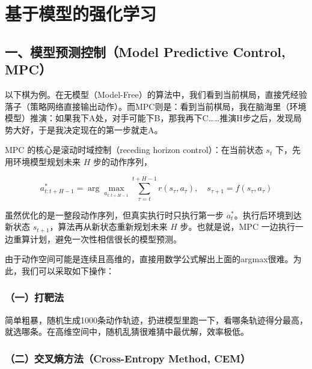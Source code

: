 \clearpage

\hypertarget{ux57faux4e8eux6a21ux578bux7684ux5f3aux5316ux5b66ux4e60}{%
\section{基于模型的强化学习}\label{ux57faux4e8eux6a21ux578bux7684ux5f3aux5316ux5b66ux4e60}}

\hypertarget{ux4e00ux6a21ux578bux9884ux6d4bux63a7ux5236model-predictive-control-mpc}{%
\subsection{一、模型预测控制（Model Predictive Control, MPC）}\label{ux4e00ux6a21ux578bux9884ux6d4bux63a7ux5236model-predictive-control-mpc}}

以下棋为例。在无模型（Model-Free）的算法中，我们看到当前棋局，直接凭经验落子（策略网络直接输出动作）。而MPC则是：看到当前棋局，我在脑海里（环境模型）推演：如果我下A处，对手可能下B，那我再下C\ldots\ldots 推演H步之后，发现局势大好，于是我决定现在的第一步就走A。

MPC 的核心是滚动时域控制（receding horizon control）：在当前状态 \(s_t\) 下，先用环境模型规划未来 \(H\) 步的动作序列，

\[
a^*_{t:t+H-1}=\arg\max_{a_{t:t+H-1}}\sum_{\tau=t}^{t+H-1}r(s_\tau,a_\tau),
\quad s_{\tau+1}=f(s_\tau,a_\tau)
\]

虽然优化的是一整段动作序列，但真实执行时只执行第一步 \(a_t^*\)。执行后环境到达新状态 \(s_{t+1}\)，算法再从新状态重新规划未来 \(H\) 步。也就是说，MPC 一边执行一边重算计划，避免一次性相信很长的模型预测。

由于动作空间可能是连续且高维的，直接用数学公式解出上面的argmax很难。为此，我们可以采取如下操作：

\hypertarget{ux4e00ux6253ux9776ux6cd5}{%
\subsubsection{（一）打靶法}\label{ux4e00ux6253ux9776ux6cd5}}

简单粗暴，随机生成1000条动作轨迹，扔进模型里跑一下，看哪条轨迹得分最高，就选哪条。在高维空间中，随机乱猜很难猜中最优解，效率极低。

\hypertarget{ux4e8cux4ea4ux53c9ux71b5ux65b9ux6cd5cross-entropy-method-cem}{%
\subsubsection{（二）交叉熵方法（Cross-Entropy Method, CEM）}\label{ux4e8cux4ea4ux53c9ux71b5ux65b9ux6cd5cross-entropy-method-cem}}

